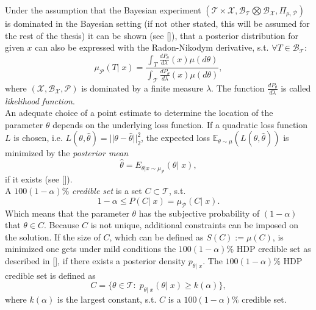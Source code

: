 \documentclass[12pt,letterpaper]{article}
\begin{document}
Under the assumption that the Bayesian experiment $(\mathcal{T}\times\mathcal{X},  \mathcal{B}_\mathcal{T}\bigotimes\mathcal{B}_\mathcal{X}, \Pi_{\mu,\mathcal{P}})$ is dominated in the Bayesian setting (if not other stated, this will be assumed for the rest of the thesis) it can be shown (see [\cite{interbayes}]), that a posterior distribution for given $x$ can also be expressed with the Radon-Nikodym derivative, s.t. $\forall T \in \mathcal{B}_\mathcal{T}:$
\begin{equation}
\label{eq:dpost}
 \mu_\mathcal{P}(T|\; x) = \frac{\int_T \frac{dP_\theta}{d\lambda}(x)\mu(d\theta)}{\int_\mathcal{T} \frac{dP_\theta}{d\lambda}(x)\mu(d\theta)},
\end{equation} 
where $(\mathcal{X}, \mathcal{B}_\mathcal{X}, \mathcal{P})$ is dominated by a finite measure $\lambda$. The function $\frac{dP_\theta}{d\lambda}$ is called \textit{likelihood function}. 
\\An adequate choice of a point estimate to determine the location of the parameter $\theta$ depends on the underlying loss function. If a quadratic loss function $L$ is chosen, i.e. $L(\theta, \hat{\theta}) = ||\theta - \hat{\theta}||_2^2$, the expected loss $\mathbb{E}_{\theta \sim \mu} (L(\theta, \hat{\theta}))$ is minimized by the \textit{posterior mean} 
\begin{equation}
\label{eq:pmean}
	\hat{\theta} = E_{\theta |x \sim \mu_\mathcal{P}}(\theta |\; x),
\end{equation}
 if it exists (see [\cite{statdec}]). 
\\ A $100(1-\alpha)\%$ \textit{credible set} is a set $C \subset \mathcal{T}$, s.t.
\begin{equation}
1 - \alpha \leq P(C| \;x ) = \mu_\mathcal{P}(C|\; x).
\end{equation}
Which means that the parameter $\theta$ has the subjective probability of $(1-\alpha)$ that $\theta \in C$.
Because $C$ is not unique, additional constraints can be imposed on the solution. If the size of $C$, which can be defined as  $S(C) := \mu(C)$, is minimized one gets under mild conditions the  $100(1-\alpha)\%$  HDP credible set  as described in [\cite{statdec}], if there exists a posterior density $p_{\theta|\;x}$.
The  $100(1-\alpha)\%$ HDP credible set is defined as  
\begin{equation}
\label{eq:hdp}
C = \{\theta \in \mathcal{T}: \; p_{\theta|\;x}(\theta|\; x) \geq k(\alpha)\},
\end{equation}
where $k(\alpha)$ is the largest constant, s.t. $C$ is a $100(1-\alpha)\%$ credible set.
\newpage
\end{document}
